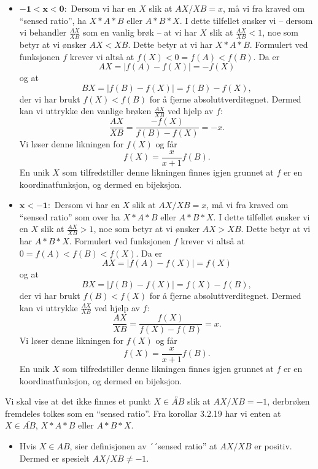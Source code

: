 \begin{oppgave}[5.6.14]
\begin{punkt}
\begin{itemize}
            \item $\mathbf{-1<x<0:}$
            Dersom vi har en $X$ slik at $AX/XB=x$, må vi fra kraved om ``sensed ratio'', ha $X\ast A\ast B$ eller $A\ast B\ast X$.
            I dette tilfellet ønsker vi -- dersom vi behandler $\frac{AX}{XB}$ som en vanlig brøk -- at vi har $X$ slik at $\frac{AX}{XB}<1$, noe som betyr at vi ønsker $AX<XB$. 
            Dette betyr at vi har $X\ast A\ast B$. 
            Formulert ved funksjonen $f$ krever vi altså at $f(X)<0=f(A)<f(B)$.
            Da er 
            $$AX=|f(A)-f(X)|=-f(X)$$
            og at 
            $$BX=|f(B)-f(X)|=f(B)-f(X),$$
            der vi har brukt $f(X)<f(B)$ for å fjerne absoluttverditegnet. 
            Dermed kan vi uttrykke den vanlige brøken $\frac{AX}{XB}$ ved hjelp av $f$:
            $$\frac{AX}{XB}=\frac{-f(X)}{f(B)-f(X)}=-x.$$
            Vi løser denne likningen for $f(X)$ og får
            $$f(X)=\frac{x}{x+1} f(B).$$
            En unik $X$ som tilfredstiller denne likningen finnes igjen grunnet at $f$ er en koordinatfunksjon, og dermed en bijeksjon. 
            
            \item $\mathbf{x<-1:}$
            Dersom vi har en $X$ slik at $AX/XB=x$, må vi fra kraved om ``sensed ratio'' som over ha $X\ast A\ast B$ eller $A\ast B\ast X$.
            I dette tilfellet ønsker vi en $X$ slik at $\frac{AX}{XB}>1$, noe som betyr at vi ønsker $AX>XB$. 
            Dette betyr at vi har $A\ast B\ast X$. 
            Formulert ved funksjonen $f$ krever vi altså at $0=f(A)<f(B)<f(X)$.
            Da er 
            $$AX=|f(A)-f(X)|=f(X)$$
            og at 
            $$BX=|f(B)-f(X)|=f(X)-f(B),$$
            der vi har brukt $f(B)<f(X)$ for å fjerne absoluttverditegnet. 
            Dermed kan vi uttrykke $\frac{AX}{XB}$ ved hjelp av $f$:
            $$\frac{AX}{XB}=\frac{f(X)}{f(X)-f(B)}=x.$$
            Vi løser denne likningen for $f(X)$ og får
            $$f(X)=\frac{x}{x+1}f(B).$$
            En unik $X$ som tilfredstiller denne likningen finnes igjen grunnet at $f$ er en koordinatfunksjon, og dermed en bijeksjon. 
        \end{itemize}
    \end{punkt}

    \begin{punkt}
        Vi skal vise at det ikke finnes et punkt $X\in\overleftrightarrow{AB}$ slik at $AX/XB = -1$, derbrøken fremdeles tolkes som en ``sensed ratio''. 
        Fra korollar 3.2.19 har vi enten at $X\in \overline{AB}$, $X \ast A \ast B$ eller $A \ast B \ast X$.
        \begin{itemize}
            \item Hvis $X \in AB$, sier definisjonen av ´´sensed ratio'' at $AX/XB$ er positiv. 
            Dermed er spesielt $AX/XB \neq -1$.


\end{itemize}
\end{punkt}
\end{oppgave}

